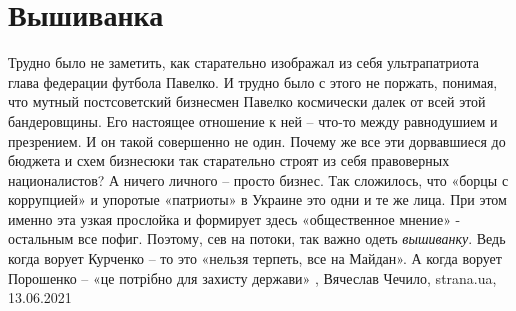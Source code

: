  
 
 
 
 
\chapter{Вышиванка}
\label{sec:slova.vyshyvanka}

Трудно было не заметить, как старательно изображал из себя ультрапатриота глава
федерации футбола Павелко. И трудно было с этого не поржать, понимая, что
мутный постсоветский бизнесмен Павелко космически далек от всей этой
бандеровщины. Его настоящее отношение к ней – что-то между равнодушием и
презрением.  И он такой совершенно не один. Почему же все эти дорвавшиеся до
бюджета и схем бизнесюки так старательно строят из себя правоверных
националистов? А ничего личного – просто бизнес. Так сложилось, что «борцы с
коррупцией» и упоротые «патриоты» в Украине это одни и те же лица. При этом
именно эта узкая прослойка и формирует здесь «общественное мнение» - остальным
все пофиг.  Поэтому, сев на потоки, так важно одеть \emph{вышиванку}. Ведь когда
ворует Курченко – то это «нельзя терпеть, все на Майдан». А когда ворует
Порошенко – «це потрібно для захисту держави»
,
Вячеслав Чечило, strana.ua, 13.06.2021



